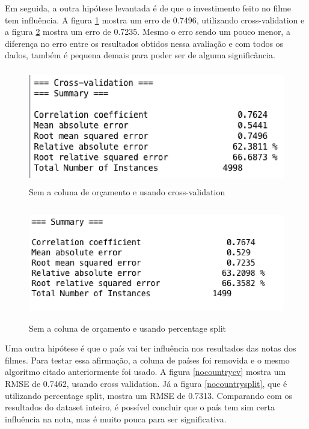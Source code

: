 Em seguida, a outra hipótese levantada é de que o investimento feito no filme tem influência. A figura \ref{nobudgetcv} mostra um erro de 0.7496, utilizando cross-validation e a figura \ref{nobudgetsplit} mostra um erro de 0.7235. Mesmo o erro sendo um pouco menor, a diferença no erro entre os resultados obtidos nessa avaliação e com todos os dados, também é pequena demais para poder ser de alguma significância.

\begin{figure}[H]
\centering
\includegraphics[height=5cm]{imagens/no_budget_cv.png}
\caption{Sem a coluna de orçamento e usando cross-validation}
\label{nobudgetcv}
\end{figure}

\begin{figure}[H]
\centering
\includegraphics[height=5cm]{imagens/no_budget_split.png}
\caption{Sem a coluna de orçamento e usando percentage split}
\label{nobudgetsplit}
\end{figure}


Uma outra hipótese é que o país vai ter influência nos resultados das notas dos filmes. Para testar essa afirmação, a coluna de países foi removida e o mesmo algoritmo citado anteriormente foi usado. A figura \ref{nocountrycv} mostra um RMSE de 0.7462, usando cross validation. Já a figura \ref{nocountrysplit}, que é utilizando percentage split, mostra um RMSE de 0.7313. Comparando com os resultados do dataset inteiro, é possível concluir que o país tem sim certa influência na nota, mas é muito pouca para ser significativa. 

